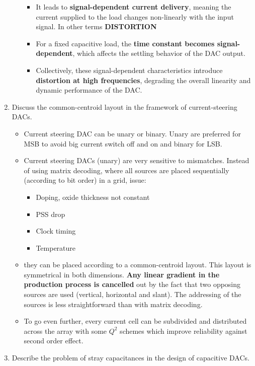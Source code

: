 \documentclass[
  a4paper,
]{article}
\providecommand{\tightlist}{%
  \setlength{\itemsep}{0pt}\setlength{\parskip}{0pt}}
\begin{document}
\begin{enumerate}
\begin{itemize}
    \begin{itemize}
    \tightlist
    \item
      It leads to \textbf{signal-dependent current delivery}, meaning
      the current supplied to the load changes non-linearly with the
      input signal. In other terms \textbf{DISTORTION}
    \item
      For a fixed capacitive load, the \textbf{time constant becomes
      signal-dependent}, which affects the settling behavior of the DAC
      output.
    \item
      Collectively, these signal-dependent characteristics introduce
      \textbf{distortion at high frequencies}, degrading the overall
      linearity and dynamic performance of the DAC.
    \end{itemize}
  \end{itemize}
\item
  Discuss the common-centroid layout in the framework of
  current-steering DACs.

  \begin{itemize}
  \tightlist
  \item
    Current steering DAC can be unary or binary. Unary are preferred for
    MSB to avoid big current switch off and on and binary for LSB.
  \item
    Current steering DACs (unary) are very sensitive to mismatches.
    Instead of using matrix decoding, where all sources are placed
    sequentially (according to bit order) in a grid, issue:

    \begin{itemize}
    \tightlist
    \item
      Doping, oxide thickness not constant
    \item
      PSS drop
    \item
      Clock timing
    \item
      Temperature
    \end{itemize}
  \item
    they can be placed according to a common-centroid layout. This
    layout is symmetrical in both dimensions. \textbf{Any linear
    gradient in the production process is cancelled} out by the fact
    that two opposing sources are used (vertical, horizontal and slant).
    The addressing of the sources is less straightforward than with
    matrix decoding.
  \item
    To go even further, every current cell can be subdivided and
    distributed across the array with some \(Q^2\) schemes which improve
    reliability against second order effect.
  \end{itemize}
\item
  Describe the problem of stray capacitances in the design of capacitive
  DACs.


\end{enumerate}
\end{document}
